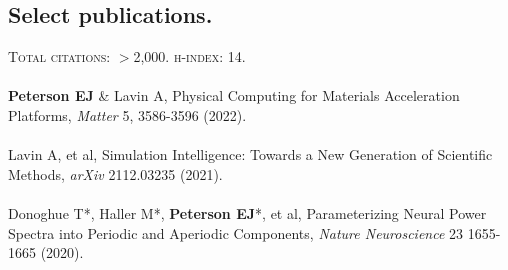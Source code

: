 \documentclass[margin,line]{res}
\begin{document}
\begin{resume}
\vspace{-.4cm} 
\section{\sc Select publications.}
\textsc{Total citations}: $>$2,000. \textsc{h-index}: 14.
\\ 
\vspace{-.4cm} 
\\
\textbf{Peterson EJ} \& Lavin A, Physical Computing for Materials Acceleration Platforms, \textit{Matter} 5, 3586-3596 (2022).
\\ 
\vspace{-.35cm} 
\\
Lavin A, et al, Simulation Intelligence: Towards a New Generation of Scientific Methods, \emph{arXiv} 2112.03235 (2021).
\\ 
\vspace{-.35cm} 
\\
Donoghue T*, Haller M*, \textbf{Peterson EJ}*, et al, Parameterizing Neural Power Spectra into Periodic and Aperiodic Components, \emph{Nature Neuroscience} 23 1655-1665 (2020). 

\end{resume}
\end{document}
